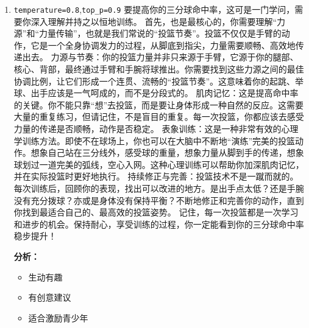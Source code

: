\documentclass{article}
\theoremstyle{plain}
\theoremstyle{definition}
\theoremstyle{remark}
\begin{document}
\begin{enumerate}
  \item
  \lstinline{temperature=0.8},\lstinline{top_p=0.9}
  要提高你的三分球命中率，这可是一门学问，需要你深入理解并持之以恒地训练。
  首先，也是最核心的，你需要理解“力源”和“力量传输”，也就是我们常说的“投篮节奏”。投篮不仅仅是手臂的动作，它是一个全身协调发力的过程，从脚底到指尖，力量需要顺畅、高效地传递出去。
  力源与节奏：你的投篮力量并非只来源于手臂，它源于你的腿部、核心、背部，最终通过手臂和手腕将球推出。你需要找到这些力源之间的最佳协调比例，让它们形成一个连贯、流畅的“投篮节奏”。这意味着你的起跳、举球、出手应该是一气呵成的，而不是分段式的。
  肌肉记忆：这是提高命中率的关键。你不能只靠“想”去投篮，而是要让身体形成一种自然的反应。这需要大量的重复练习，但请记住，不是盲目的重复。每一次投篮，你都应该去感受力量的传递是否顺畅，动作是否稳定。
  表象训练：这是一种非常有效的心理学训练方法。即使不在球场上，你也可以在大脑中不断地“演练”完美的投篮动作。想象自己站在三分线外，感受球的重量，想象力量从脚到手的传递，想象球划过一道完美的弧线，空心入网。这种心理训练可以帮助你加深肌肉记忆，并在实际投篮时更好地执行。
  持续修正与完善：投篮技术不是一蹴而就的。每次训练后，回顾你的表现，找出可以改进的地方。是出手点太低？还是手腕没有充分拨球？亦或是身体没有保持平衡？不断地修正和完善你的动作，直到你找到最适合自己的、最高效的投篮姿势。
  记住，每一次投篮都是一次学习和进步的机会。保持耐心，享受训练的过程，你一定能看到你的三分球命中率稳步提升！
 
  \textbf{分析：}
  \begin{itemize}
    \item 生动有趣
    \item 有创意建议
    \item 适合激励青少年
  \end{itemize}
\end{enumerate}
\end{document}
